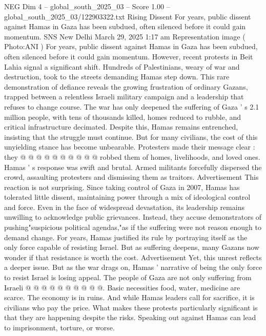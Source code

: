 \begin{textsample}{NEG Dim 4 – global\_south\_2025\_03 – Score 1.00 – global\_south\_2025\_03/122903322.txt}  \label{ex:f4_neg_430}
Rising Dissent For years, public dissent against Hamas in Gaza has been subdued, often silenced before it could gain momentum.
SNS New Delhi March 29, 2025 1:17 am Representation image ( Photo:ANI ) For years, public dissent against Hamas in Gaza has been subdued, often silenced before it could gain momentum.
However, recent protests in Beit Lahia signal a significant shift.
Hundreds of Palestinians, weary of war and destruction, took to the streets demanding Hamas step down.
This rare demonstration of defiance reveals the growing frustration of ordinary Gazans, trapped between a relentless Israeli military campaign and a leadership that refuses to change course.
The war has only deepened the suffering of Gaza ' s 2.1 million people, with tens of thousands killed, homes reduced to rubble, and critical infrastructure decimated.
Despite this, Hamas remains entrenched, insisting that the struggle must continue.
But for many civilians, the cost of this unyielding stance has become unbearable.
Protesters made their message clear : they @ @ @ @ @ @ @ @ @ @ robbed them of homes, livelihoods, and loved ones.
Hamas ' s response was swift and brutal.
Armed militants forcefully dispersed the crowd, assaulting protesters and dismissing them as traitors.
Advertisement This reaction is not surprising.
Since taking control of Gaza in 2007, Hamas has tolerated little dissent, maintaining power through a mix of ideological control and force.
Even in the face of widespread devastation, its leadership remains unwilling to acknowledge public grievances.
Instead, they accuse demonstrators of pushing"suspicious political agendas,"as if the suffering were not reason enough to demand change.
For years, Hamas justified its rule by portraying itself as the only force capable of resisting Israel.
But as suffering deepens, many Gazans now wonder if that resistance is worth the cost.
Advertisement Yet, this unrest reflects a deeper issue.
But as the war drags on, Hamas ' narrative of being the only force to resist Israel is losing appeal.
The people of Gaza are not only suffering from Israeli @ @ @ @ @ @ @ @ @ @.
Basic necessities food, water, medicine are scarce.
The economy is in ruins.
And while Hamas leaders call for sacrifice, it is civilians who pay the price.
What makes these protests particularly significant is that they are happening despite the risks.
Speaking out against Hamas can lead to imprisonment, torture, or worse.

\end{textsample}
